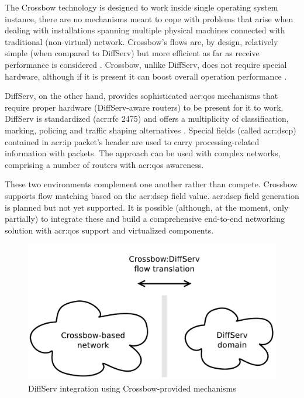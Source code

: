 \documentclass[11pt,openany]{book}
\begin{document}
        The Crossbow technology is designed to work inside single operating system instance, there are no mechanisms
        meant to cope with problems that arise when dealing with installations spanning multiple physical machines
        connected with traditional (non-virtual) network. Crossbow's flows are, by design, relatively simple (when
        compared to DiffServ) but more efficient as far as receive performance is considered \cite{xbow-vertically}.
        Crossbow, unlike DiffServ, does not require special hardware, although if it is present it can boost overall
        operation performance \cite{xbow-vertically}.

        DiffServ, on the other hand, provides sophisticated \gls{acr:qos} mechanisms that require proper hardware
        (DiffServ-aware routers) to be present for it to work. DiffServ is standardized (\gls{acr:rfc} 2475) and offers
        a multiplicity of classification, marking, policing and traffic shaping alternatives \cite{rfc2475}. Special
        fields (called \gls{acr:dscp}) contained in \gls{acr:ip} packet's header are used to carry processing-related
        information with packets. The approach can be used with complex networks, comprising a number of routers with
        \gls{acr:qos} awareness.

        These two environments complement one another rather than compete. Crossbow supports flow matching based on the
        \gls{acr:dscp} field value. \gls{acr:dscp} field generation is planned but not yet supported. It is possible
        (although, at the moment, only partially) to integrate these and build a comprehensive end-to-end networking
        solution with \gls{acr:qos} support and virtualized components.

        \begin{figure}[H]
          \begin{center}
            \includegraphics[width=.7\textwidth]{img/solaris/xbow-diffserv.pdf}
          \end{center}

          \caption{DiffServ integration using Crossbow-provided mechanisms}
        \end{figure}
\end{document}
